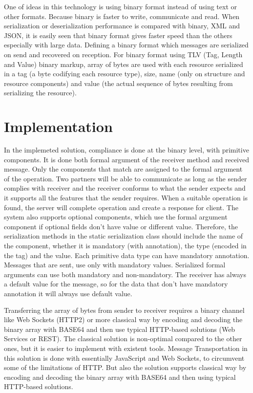 \documentclass[runningheads,a4paper]{llncs}
\begin{document}
One of ideas in this technology is using binary format instead of using text or other formats. Because binary is faster to write, communicate and read. When serialization or deserialization performance is compared with binary, XML and JSON, it is easily seen that binary format gives faster speed than the others especially with large data\cite{binaryOnline}.
Defining a binary format which messages are serialized on send and recovered on reception. For binary format using TLV (Tag, Length and Value) binary markup\cite{asn1}, array of bytes are used with each resource serialized in a tag (a byte codifying each resource type), size, name (only on structure and resource components) and value (the actual sequence of bytes resulting from serializing the resource).
\section{Implementation}
In the implemeted solution, compliance is done at the binary level, with primitive components. It is done both formal argument of the receiver method and received message. Only the components that match are assigned to the formal argument of the operation. Two partners will be able to communicate as long as the sender complies with receiver and the receiver conforms to what the sender expects and it supports all the features that the sender requires. When a suitable operation is found, the server will complete operation and create a response for client. The system also supports optional components, which use the formal argument component if optional fields don’t have value or different value. Therefore, the serialization methods in the static serialization class should include the name of the component, whether it is mandatory (with annotation), the type (encoded in the tag) and the value. Each primitive data type can have mandatory annotation. Messages that are sent, use only with mandatory values. Serialized formal arguments can use both mandatory and non-mandatory. The receiver has always a default value for the message, so for the data that don’t have mandatory annotation it will always use default value.

Transferring the array of bytes from sender to receiver requires a binary channel like Web Sockets (HTTP2) or more classical way by encoding and decoding the binary array with BASE64 and then use typical HTTP-based solutions (Web Services or REST). The classical solution is non-optimal compared to the other ones, but it is easier to implement with existent tools. Message Transportation in this solution is done with essentially JavaScript and Web Sockets, to circumvent some of the limitations of HTTP. But also the solution supports classical way by encoding and decoding the binary array with BASE64 and then using typical HTTP-based solutions.
\end{document}
